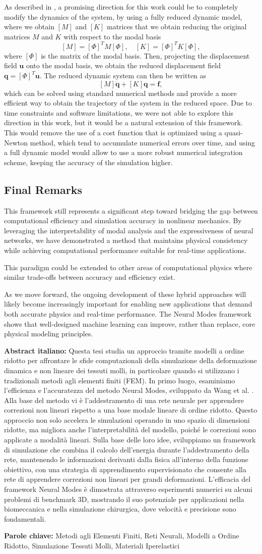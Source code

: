 \documentclass[11pt,a4paper]{article}
\numberwithin{equation}{section}
\newcommand{\abstractita}{Questa tesi studia un approccio tramite modelli a ordine ridotto per affrontare le sfide computazionali della simulazione della deformazione dinamica e non lineare dei tessuti molli, in particolare quando si utilizzano i tradizionali metodi agli elementi finiti (FEM). In primo luogo, esaminiamo l'efficienza e l'accuratezza del metodo Neural Modes, sviluppato da Wang et al. \cite{Wang_Du_Coros_Thomaszewski_2024}. Alla base del metodo vi è l'addestramento di una rete neurale per apprendere correzioni non lineari rispetto a una base modale lineare di ordine ridotto. Questo approccio non solo accelera le simulazioni operando in uno spazio di dimensioni ridotte, ma migliora anche l'interpretabilità del modello, poiché le correzioni sono applicate a modalità lineari. Sulla base delle loro idee, sviluppiamo un framework di simulazione che combina il calcolo dell'energia durante l'addestramento della rete, mantenendo le informazioni derivanti dalla fisica all'interno della funzione obiettivo, con una strategia di apprendimento supervisionato che consente alla rete di apprendere correzioni non lineari per grandi deformazioni. 
L'efficacia del framework Neural Modes è dimostrata attraverso esperimenti numerici su alcuni problemi di benchmark 3D, mostrando il suo potenziale per applicazioni nella biomeccanica e nella simulazione chirurgica, dove velocità e precisione sono fondamentali.
}
\newcommand{\keywordsita}{Metodi agli Elementi Finiti, Reti Neurali, Modelli a Ordine Ridotto, Simulazione Tessuti Molli, Materiali Iperelastici}
\begin{document}
As described in \cite{Andersson_2021}, a promising direction for this work could be to completely modify the dynamics of the system, by using a fully reduced dynamic model, where we obtain \(\left[M\right]\) and \(\left[K\right]\) matrices that we obtain reducing the original matrices \(M\) and \(K\) with respect to the modal basis
\begin{equation}
    \left[M\right] = \left[\Phi\right]^T M \left[\Phi\right], \quad \left[K\right] = \left[\Phi\right]^T K \left[\Phi\right],
\end{equation}
where \(\left[\Phi\right]\) is the matrix of the modal basis. Then, projecting the displacement field \(\mathbf{u}\) onto the modal basis, we obtain the reduced displacement field \(\mathbf{q} = \left[\Phi\right]^T \mathbf{u}\). The reduced dynamic system can then be written as
\begin{equation}
    \left[{M}\right] \ddot{\mathbf{q}} + \left[{K}\right] \mathbf{q} = \mathbf{f},
\end{equation}
which can be solved using standard numerical methods and provide a more efficient way to obtain the trajectory of the system in the reduced space. Due to time constraints and software limitations, we were not able to explore this direction in this work, but it would be a natural extension of this framework. This would remove the use of a cost function that is optimized using a quasi-Newton method, which tend to accumulate numerical errors over time, and using a full dynamic model would allow to use a more robust numerical integration scheme, keeping the accuracy of the simulation higher.


\subsection{Final Remarks}
This framework still represents a significant step toward bridging the gap between computational efficiency and simulation accuracy in nonlinear mechanics. By leveraging the interpretability of modal analysis and the expressiveness of neural networks, we have demonstrated a method that maintains physical consistency while achieving computational performance suitable for real-time applications.

This paradigm could be extended to other areas of computational physics where similar trade-offs between accuracy and efficiency exist.

As we move forward, the ongoing development of these hybrid approaches will likely become increasingly important for enabling new applications that demand both accurate physics and real-time performance. The Neural Modes framework shows that well-designed machine learning can improve, rather than replace, core physical modeling principles.
\newpage
\printbibliography

\newpage
\textbf{Abstract italiano:} \abstractita

\begin{tcolorbox}[arc=0pt, boxrule=0pt, colback=bluePoli!60, width=\textwidth, colupper=white]
        \textbf{Parole chiave:} \keywordsita
    \end{tcolorbox}
\end{document}

